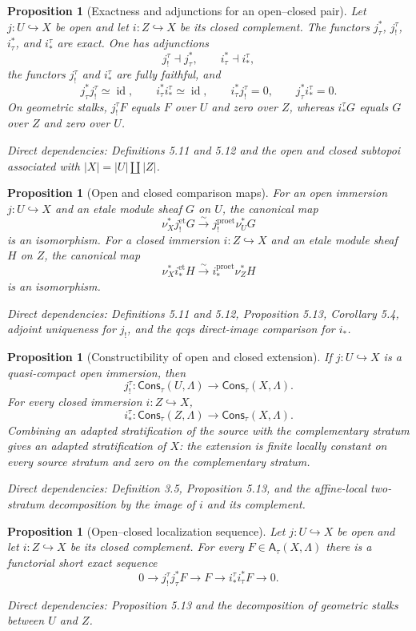 \documentclass[10pt]{article}
\newtheorem{proposition}[theorem]{Proposition}
\theoremstyle{definition}
\newcommand{\Lam}{\Lambda}
\newcommand{\Cons}{\mathsf{Cons}}
\newcommand{\et}{\mathrm{et}}
\newcommand{\proet}{\mathrm{proet}}
\newcommand{\id}{\operatorname{id}}
\newcommand{\dep}[1]{\par\smallskip\noindent\textit{Direct dependencies: #1}}
\begin{document}
\begin{proposition}[Exactness and adjunctions for an open--closed pair]
Let $j:U\hookrightarrow X$ be open and let $i:Z\hookrightarrow X$ be its
closed complement.  The functors $j_\tau^*$, $j_!^\tau$, $i_\tau^*$, and
$i_*^\tau$ are exact.  One has adjunctions
\[
j_!^\tau\dashv j_\tau^*,\qquad i_\tau^*\dashv i_*^\tau,
\]
the functors $j_!^\tau$ and $i_*^\tau$ are fully faithful, and
\[
j_\tau^*j_!^\tau\simeq\id,\qquad i_\tau^*i_*^\tau\simeq\id,
\qquad i_\tau^*j_!^\tau=0,\qquad j_\tau^*i_*^\tau=0.
\]
On geometric stalks, $j_!^\tau F$ equals $F$ over $U$ and zero over $Z$,
whereas $i_*^\tau G$ equals $G$ over $Z$ and zero over $U$.
\dep{Definitions 5.11 and 5.12 and the open and closed subtopoi associated with
$|X|=|U|\amalg|Z|$.}
\end{proposition}

\begin{proposition}[Open and closed comparison maps]
For an open immersion $j:U\hookrightarrow X$ and an etale module sheaf $G$ on
$U$, the canonical map
\[
\nu_X^*j_!^\et G\xrightarrow{\sim}j_!^\proet\nu_U^*G
\]
is an isomorphism.  For a closed immersion $i:Z\hookrightarrow X$ and an
etale module sheaf $H$ on $Z$, the canonical map
\[
\nu_X^*i_*^\et H\xrightarrow{\sim}i_*^\proet\nu_Z^*H
\]
is an isomorphism.
\dep{Definitions 5.11 and 5.12, Proposition 5.13, Corollary 5.4, adjoint uniqueness for $j_!$, and
the qcqs direct-image comparison for $i_*$.}
\end{proposition}

\begin{proposition}[Constructibility of open and closed extension]
If $j:U\hookrightarrow X$ is a quasi-compact open immersion, then
\[
j_!^\tau:\Cons_\tau(U,\Lam)\longrightarrow\Cons_\tau(X,\Lam).
\]
For every closed immersion $i:Z\hookrightarrow X$,
\[
i_*^\tau:\Cons_\tau(Z,\Lam)\longrightarrow\Cons_\tau(X,\Lam).
\]
Combining an adapted stratification of the source with the complementary
stratum gives an adapted stratification of $X$: the extension is finite locally
constant on every source stratum and zero on the complementary stratum.
\dep{Definition 3.5, Proposition 5.13, and the affine-local two-stratum
decomposition by the image of $i$ and its complement.}
\end{proposition}

\begin{proposition}[Open--closed localization sequence]
Let $j:U\hookrightarrow X$ be open and let $i:Z\hookrightarrow X$ be its
closed complement.  For every $F\in\mathsf A_\tau(X,\Lam)$ there is a
functorial short exact sequence
\[
0\longrightarrow j_!^\tau j_\tau^*F
\longrightarrow F
\longrightarrow i_*^\tau i_\tau^*F
\longrightarrow0.
\]
\dep{Proposition 5.13 and the decomposition of geometric stalks between $U$
and $Z$.}
\end{proposition}
\end{document}
